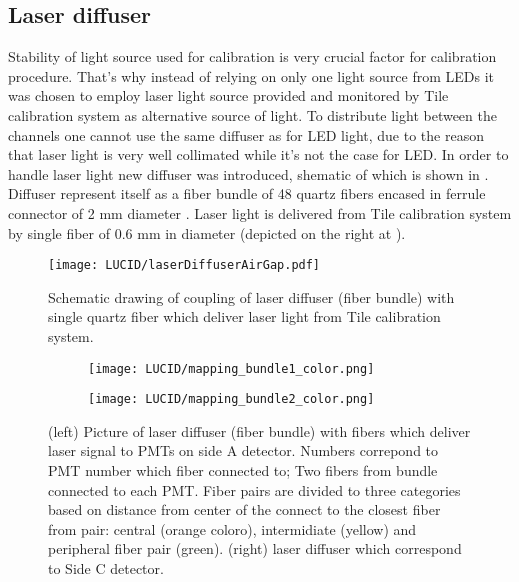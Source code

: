 
\subsection{Laser diffuser}
\label{subsec:laserDiffuser}


Stability of light source used for calibration is very crucial factor for calibration procedure.
That's why instead of relying on only one light source from LEDs it was chosen to employ laser light source 
provided and monitored by Tile calibration system \cite{atlasGeneral} as alternative source of light. 
To distribute light between the channels one cannot use the same diffuser as for LED light, 
due to the reason that laser light is very well collimated while it's not the case for LED.
In order to handle laser light new diffuser was introduced, shematic of which is shown in .
Diffuser represent itself as a fiber bundle of 48 quartz fibers encased in ferrule connector of 2 mm diameter .
Laser light is delivered from Tile calibration system by single fiber of 0.6 mm in diameter (depicted on the right at ).



\begin{figure}
\centering
\texttt{[image: LUCID/laserDiffuserAirGap.pdf]}
\caption{Schematic drawing of coupling of laser diffuser (fiber bundle) with single quartz fiber which deliver laser light from Tile calibration system.}
\label{fig:laserDiffuserSchematics}
\end{figure}

\begin{figure}
\centering
\begin{subfigure}{.45\textwidth}
  \centering
  \texttt{[image: LUCID/mapping\_bundle1\_color.png]}
\end{subfigure}%
\begin{subfigure}{.45\textwidth}
  \centering
  \texttt{[image: LUCID/mapping\_bundle2\_color.png]}
\end{subfigure}
\caption{(left) Picture of laser diffuser (fiber bundle) with fibers which deliver laser signal to PMTs on side A detector. Numbers correpond to PMT number 
which fiber connected to; 
Two fibers from bundle connected to each PMT. Fiber pairs are divided to three categories based on distance from center of the connect to the closest fiber 
from pair: 
central (orange coloro), intermidiate (yellow) and peripheral fiber pair (green).
(right) laser diffuser which correspond to Side C detector.}
\label{fig:laserDiffuserMapping}
\end{figure}

